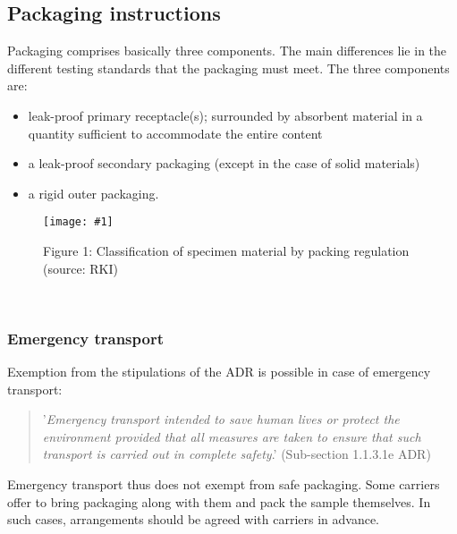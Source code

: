 \documentclass{article}
\newlength{\imgwidth}
\newcommand\scaledgraphics[2]{%
                
\settowidth{\imgwidth}{\texttt{[image: \#1]}}%
                
\setlength{\imgwidth}{\minof{\imgwidth}{#2\textwidth}}%
                
\texttt{[image: \#1]}%
                
}
\begin{document}
\subsection{Packaging instructions}\label{H7057835}



Packaging comprises basically three components. The main differences lie in the different testing standards that the packaging must meet. The three components are:

\begin{itemize}
\item leak-proof primary receptacle(s); surrounded by absorbent material in a quantity sufficient to accommodate the entire content


\item a leak-proof secondary packaging (except in the case of solid materials)


\item a rigid outer packaging.


\end{itemize}
\begin{figure}
\scaledgraphics{54dc3868-8644-4775-8045-d9d5ac6a31d4.png}{1}
\caption*{Figure 1: Classification of specimen material by packing regulation (source: RKI)}\label{F68902161}
\end{figure}


 \emph{\textbf{ }}


\subsubsection{Emergency transport}\label{H7808306}



Exemption from the stipulations of the ADR is possible in case of emergency transport:

\begin{quote}



'\emph{Emergency transport intended to save human lives or protect the environment provided that all measures are taken to ensure that such transport is carried out in complete safety}.' (Sub-section 1.1.3.1e ADR)


\end{quote}


Emergency transport thus does not exempt from safe packaging. Some carriers offer to bring packaging along with them and pack the sample themselves. In such cases, arrangements should be agreed with carriers in advance.
\end{document}
